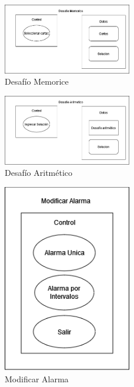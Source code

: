 \begin{figure}[H]
	\centering
	\includegraphics[width=0.5\textwidth]{./img/componentes/09-DesafioMemorice.png}
	\caption{Desafío Memorice}
        \vspace{5pt}
	\label{fig:Desafío Memorice}
\end{figure}

\begin{figure}[H]
	\centering
	\includegraphics[width=0.5\textwidth]{./img/componentes/10-DesafioAritmetico.png}
	\caption{Desafío Aritmético}
        \vspace{5pt}
	\label{fig:Desafío Aritmético}
\end{figure}

\begin{figure}[H]
	\centering
	\includegraphics[width=0.5\textwidth]{./img/componentes/11-ModificarAlarma.png}
	\caption{Modificar Alarma}
        \vspace{5pt}
	\label{fig:Modificar Alarma}
\end{figure}

